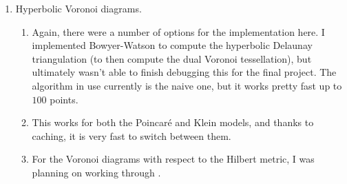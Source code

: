\documentclass[12pt]{article}%
\begin{document}
\begin{enumerate}
\begin{enumerate}
\begin{enumerate}
			Here is how this works technically \cite{goldman}: a subgroup \[\Gamma_1 *_\Lambda \Gamma_2 \subset \PSL_{d + 1}\R\] can be deformed as follows: let $(B_t)_t \subset \PSL_{d + 1}\R$ be a path of elements starting at the identity and that commute with $\Lambda$. Then we can deform $i: \Gamma \to \PSL_{d + 1}\R$ to representations $\rho_t$ which are the identity on $\Gamma_1$ and send $\gamma_2 \in \Gamma_2$ to $B_t\gamma_2B_t^{-1}$. If $\Gamma$ divides some $\Omega$, then representations $\rho_t$ are injective, and $\rho_t(\Gamma)$ divides a properly convex domain $\Omega_t$. By the Ehresmann-Thurston principle, we have that \[\Omega_t/\rho_t(\Gamma) \approx_{\text{Diffeo}} \Omega/\Gamma\] for all $t$.

			Observe, $\rho_t$ is well-defined since $B_t$ is in the identity component of the centralizer $\calZ(\PSL_3\R)$, hence both components of the representation agree on $\Lambda$. We can construct $B_t$ as follows: $B_t = e^{tB}$ where \[B = \begin{pmatrix} -1 \\ &d \\ &&-1 \\ &&&\ddots \\ &&&&-1 \end{pmatrix}.\] The project allows you to tune this $t$, and we draw $\Omega_t$.
			\item It is also currently possible to view the fundamental domain coming from the Voronoi tessellation of the triangle reflection group I chose, but not yet under the deformation. This should be an easy thing to add \cite{gezalyan2021voronoi}.
		\end{enumerate}
	\end{enumerate}
	\item Hyperbolic Voronoi diagrams.
	\begin{enumerate}
		\item Again, there were a number of options for the implementation here. I implemented Bowyer-Watson to compute the hyperbolic Delaunay triangulation (to then compute the dual Voronoi tessellation), but ultimately wasn't able to finish debugging this for the final project. The algorithm in use currently is the naive one, but it works pretty fast up to $100$ points.
		\item This works for both the Poincar\'e and Klein models, and thanks to caching, it is very fast to switch between them.
		\item For the Voronoi diagrams with respect to the Hilbert metric, I was planning on working through \cite{gezalyan2021voronoi}.
	\end{enumerate}
\end{enumerate}
\end{document}
